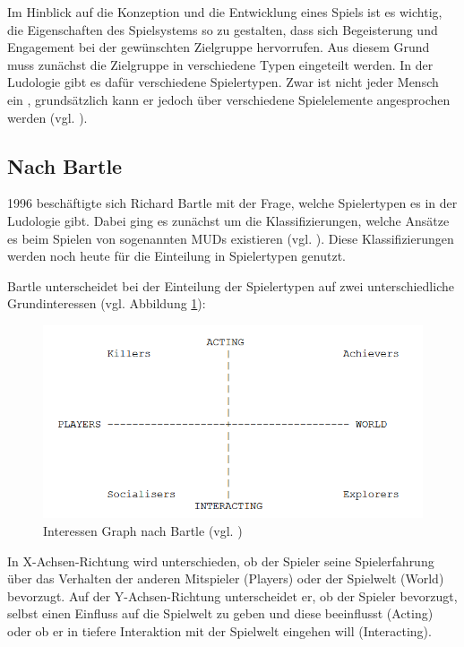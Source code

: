 Im Hinblick auf die Konzeption und die Entwicklung eines Spiels ist es wichtig, die Eigenschaften des Spielsystems so zu gestalten, dass sich Begeisterung und Engagement bei der gewünschten Zielgruppe hervorrufen. Aus diesem Grund muss zunächst die Zielgruppe in verschiedene Typen eingeteilt werden. In der Ludologie gibt es dafür verschiedene Spielertypen. Zwar ist nicht jeder Mensch ein , grundsätzlich kann er jedoch über verschiedene Spielelemente angesprochen werden (vgl. \cite{ludologie_spielertypen_nodate}).

\subsection{Nach Bartle}
1996 beschäftigte sich Richard Bartle mit der Frage, welche Spielertypen es in der Ludologie gibt. Dabei ging es zunächst um die Klassifizierungen, welche Ansätze es beim Spielen von sogenannten \ac{MUD}s existieren (vgl. \cite{bartle_hearts_1996}). Diese Klassifizierungen werden noch heute für die Einteilung in Spielertypen genutzt.

Bartle unterscheidet bei der Einteilung der Spielertypen auf zwei unterschiedliche Grundinteressen (vgl. Abbildung \ref{fig:bartle-muds}):

\begin{figure}[ht]
\centering
\includegraphics[width=1\linewidth]{content/pictures/basic_interests.PNG}
\caption{Interessen Graph nach Bartle (vgl. \cite{bartle_hearts_1996})}
\label{fig:bartle-muds}
\end{figure}

In X-Achsen-Richtung wird unterschieden, ob der Spieler seine Spielerfahrung über das Verhalten der anderen Mitspieler (Players) oder der Spielwelt (World) bevorzugt. Auf der Y-Achsen-Richtung unterscheidet er, ob der Spieler bevorzugt, selbst einen Einfluss auf die Spielwelt zu geben und diese beeinflusst (Acting) oder ob er in tiefere Interaktion mit der Spielwelt eingehen will (Interacting).

